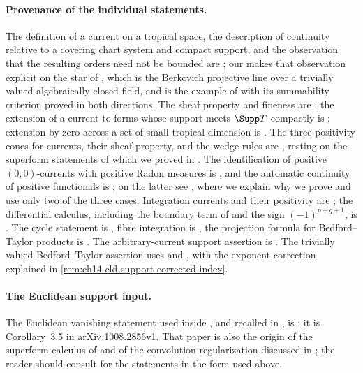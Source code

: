 \paragraph{Provenance of the individual statements.}
The definition of a current on a tropical space, the description of
continuity relative to a covering chart system and compact support, and the
observation that the resulting orders need not be bounded are
\cite[\S7.1]{CLD25}; our
 makes that observation explicit on the
star of \cite[\S6.7.3]{CLD25}, which is the Berkovich projective line over a
trivially valued algebraically closed field, and
 is the example of
\cite[7.2.14]{CLD25} with its summability criterion proved in both
directions.  The sheaf property and fineness are
\cite[Proposition~7.1.7 and Corollary~7.1.8]{CLD25}; the extension of a
current to forms whose support meets $\Supp T$ compactly is
\cite[Lemma~7.1.10]{CLD25}; extension by zero across a set of small tropical
dimension is \cite[Lemma~7.1.13]{CLD25}.  The three positivity cones for
currents, their sheaf property, and the wedge rules are
\cite[\S7.2]{CLD25}, resting on the superform statements of
\cite[\S1.2]{CLD25} which we proved in
.  The identification of positive $(0,0)$-currents with
positive Radon measures is \cite[Proposition~7.2.8]{CLD25}, and the automatic
continuity of positive functionals is \cite[Proposition~7.2.9]{CLD25}; on the
latter see , where we explain why we prove and use
only two of the three cases.  Integration currents and their positivity are
\cite[\S7.3]{CLD25}; the differential calculus, including the boundary term
of  and the sign
$(-1)^{p+q+1}$, is \cite[\S7.7]{CLD25}.  The cycle statement
 is
\cite[Proposition~16.6.3]{CLD25}, fibre integration is
\cite[Theorem~16.5.4 and Corollary~16.5.5]{CLD25}, the projection formula for
Bedford--Taylor products is \cite[Theorem~16.5.7]{CLD25}.  The
arbitrary-current support assertion is \cite[Theorem~16.8.5]{CLD25}.  The
trivially valued Bedford--Taylor assertion uses
\cite[Proposition~16.8.2 and Proposition~8.7.5]{CLD25} and
\cite[Lemma~16.8.7 and the proof of Corollary~16.8.6]{CLD25}, with the
exponent correction explained in
\cref{rem:ch14-cld-support-corrected-index}.

\paragraph{The Euclidean support input.}
The Euclidean vanishing statement used inside
\cite[Theorem~16.8.5]{CLD25}, and recalled in
, is
\cite[Corollary~4.1]{Lag12Super}; it is Corollary~3.5 in
arXiv:1008.2856v1.  That paper is also the origin of the
superform calculus of  and of the convolution
regularization discussed in ; the reader should
consult \cite[\S\S1.2 and 1.6]{CLD25} for the statements in the form used
above.


